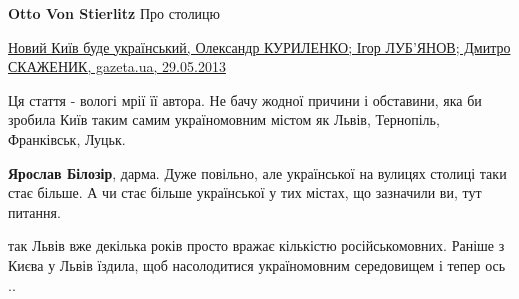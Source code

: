 \begin{itemize}
\begin{itemize}
 
\textbf{Otto Von Stierlitz} Про столицю

\href{gazeta.ua/ru/articles/opinions-journal/_novij-kiyiv-bude-ukrayinskij/499688}{%
Новий Київ буде український, Олександр КУРИЛЕНКО; Ігор ЛУБ'ЯНОВ; Дмитро СКАЖЕНИК, gazeta.ua, 29.05.2013%
}

 

Ця стаття - вологі мрії її автора. Не бачу жодної причини і обставини, яка би
зробила Київ таким самим україномовним містом як Львів, Тернопіль, Франківськ,
Луцьк.


 
\textbf{Ярослав Білозір}, дарма. Дуже повільно, але української на вулицях
столиці таки стає більше. А чи стає більше української у тих містах, що
зазначили ви, тут питання.

\end{itemize}

 

так Львів вже декілька років просто вражає кількістю російськомовних. Раніше з
Києва у Львів їздила, щоб насолодитися україномовним середовищем і тепер ось ..

\begin{itemize}
 

\end{itemize}
\end{itemize}
